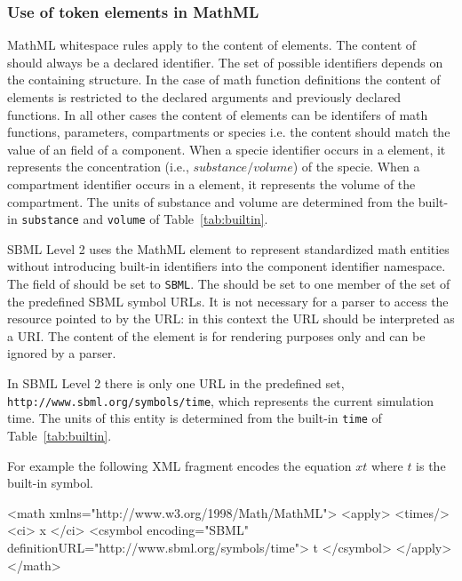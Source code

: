 \documentclass[10pt]{cekarticle}
\newcommand{\vref}[1]{\ref{#1}}
\begin{document}
\subsubsection{Use of token elements in MathML}

MathML whitespace rules apply to the content of 
elements. The content of  should always be a declared
identifier.  The set of possible identifiers depends on the
containing structure.  In the case of math function definitions
the content of  elements is restricted to the declared
arguments and previously declared functions. In all other cases
the content of  elements can be identifers of math
functions, parameters, compartments or species i.e. the content
should match the value of an  field of a component.
When a specie identifier occurs in a  element, it
represents the concentration (i.e., $substance/volume$) of the
specie. When a compartment identifier occurs in a 
element, it represents the volume of the compartment. The units of
substance and volume are determined from the built-in
\texttt{substance} and \texttt{volume} of
Table~\vref{tab:builtin}.

SBML Level 2 uses the MathML  element to represent
standardized math entities without introducing built-in
identifiers into the component identifier namespace.  The
 field of  should be set to
\texttt{SBML}.  The  should be set to one
member of the set of the predefined SBML symbol URLs.  It is not
necessary for a parser to access the resource pointed to by the
URL: in this context the URL should be interpreted as a URI.  The
content of the  element is for rendering purposes
only and can be ignored by a parser.

In SBML Level 2 there is only one URL in the predefined set,
\texttt{http://www.sbml.org/symbols/time}, which represents the
current simulation time.  The units of this entity is determined
from the built-in \texttt{time} of Table~\vref{tab:builtin}.

For example the following XML fragment encodes the equation $x t$
where $t$ is the built-in symbol.

\begin{example}
<math xmlns="http://www.w3.org/1998/Math/MathML">
    <apply>
        <times/>
        <ci> x </ci>
        <csymbol encoding="SBML"
                    definitionURL="http://www.sbml.org/symbols/time">
            t
        </csymbol>
    </apply>
</math>
\end{example}
\end{document}
